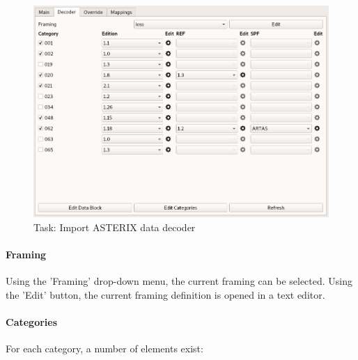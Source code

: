 \begin{figure}[H]
  \center
    \includegraphics[width=16cm,frame]{../screenshots/asterix_import_data_decoder.png}
  \caption{Task: Import ASTERIX data decoder}
\end{figure}

\paragraph{Framing}
Using the 'Framing' drop-down menu, the current framing can be selected. Using the 'Edit' button, the current framing definition is opened in a text editor.

\paragraph{Categories}

For each category, a number of elements exist:

